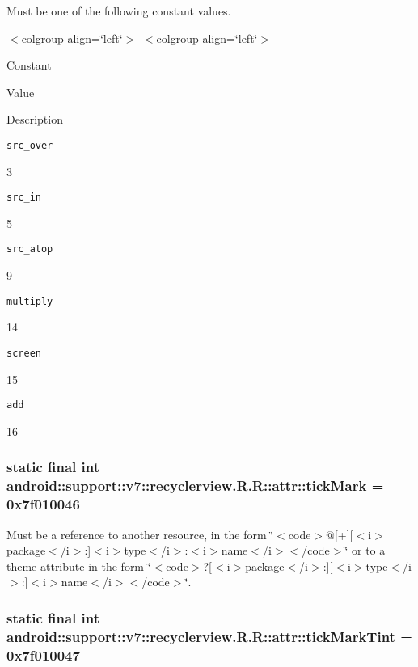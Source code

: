 Must be one of the following constant values. \begin{TabularC}{0}
\hline
\end{TabularC}
$<$colgroup align=\char`\"{}left\char`\"{}$>$ $<$colgroup align=\char`\"{}left\char`\"{}$>$ 

Constant

Value

Description 

{\tt src\_\-over}

3

{\tt src\_\-in}

5

{\tt src\_\-atop}

9

{\tt multiply}

14

{\tt screen}

15

{\tt add}

16\hypertarget{classandroid_1_1support_1_1v7_1_1recyclerview_1_1_r_1_1attr_0c471fc6a7ef63c8679c1b5b9b2996ad}{
\subsubsection[{tickMark}]{\setlength{\rightskip}{0pt plus 5cm}static final int android::support::v7::recyclerview.R.R::attr::tickMark = 0x7f010046}}
\label{classandroid_1_1support_1_1v7_1_1recyclerview_1_1_r_1_1attr_0c471fc6a7ef63c8679c1b5b9b2996ad}


Must be a reference to another resource, in the form \char`\"{}$<$code$>$@\mbox{[}+\mbox{]}\mbox{[}$<$i$>$package$<$/i$>$:\mbox{]}$<$i$>$type$<$/i$>$:$<$i$>$name$<$/i$>$$<$/code$>$\char`\"{} or to a theme attribute in the form \char`\"{}$<$code$>$?\mbox{[}$<$i$>$package$<$/i$>$:\mbox{]}\mbox{[}$<$i$>$type$<$/i$>$:\mbox{]}$<$i$>$name$<$/i$>$$<$/code$>$\char`\"{}. \hypertarget{classandroid_1_1support_1_1v7_1_1recyclerview_1_1_r_1_1attr_5a4f24dcc31c10ce72ca1b3d1814ca8d}{
\subsubsection[{tickMarkTint}]{\setlength{\rightskip}{0pt plus 5cm}static final int android::support::v7::recyclerview.R.R::attr::tickMarkTint = 0x7f010047}}
\label{classandroid_1_1support_1_1v7_1_1recyclerview_1_1_r_1_1attr_5a4f24dcc31c10ce72ca1b3d1814ca8d}


